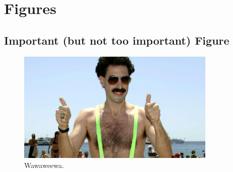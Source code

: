 \section{Figures}
\subsection{Important (but not too important) Figure}
\begin{figure}[htb]
    \centering
    \includegraphics[width=0.85\textwidth]{figs/borat-2192x1233.jpg}
    \caption{Wawaweewa.}
    \label{fig:borat}
\end{figure}